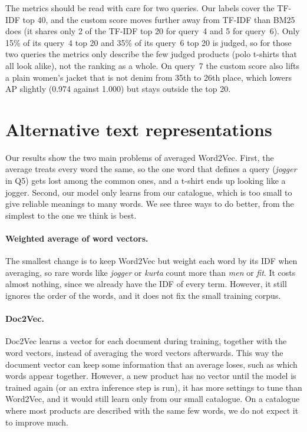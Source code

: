 \documentclass[11pt,a4paper]{article}
\begin{document}
The metrics should be read with care for two queries. Our labels cover the
TF-IDF top 40, and the custom score moves further away from TF-IDF than BM25
does (it shares only 2 of the TF-IDF top 20 for query~4 and 5 for query~6).
Only 15\% of its query~4 top 20 and 35\% of its query~6 top 20 is judged, so
for those two queries the metrics only describe the few judged products
(polo t-shirts that all look alike), not the ranking as a whole. On query~7
the custom score also lifts a plain women's jacket that is not denim from
35th to 26th place, which lowers AP slightly (0.974 against 1.000) but stays
outside the top 20.

\section{Alternative text representations}

Our results show the two main problems of averaged Word2Vec. First, the average treats every word the same, so the one word that defines a query (\emph{jogger} in Q5) gets lost among the common ones, and a t-shirt ends up looking like a jogger. Second, our model only learns from our catalogue, which is too small to give reliable meanings to many words. We see three ways to do better, from the simplest to the one we think is best.

\paragraph{Weighted average of word vectors.} The smallest change is to keep Word2Vec but weight each word by its IDF when averaging, so rare words like \emph{jogger} or \emph{kurta} count more than \emph{men} or \emph{fit}. It costs almost nothing, since we already have the IDF of every term. However, it still ignores the order of the words, and it does not fix the small training corpus.

\paragraph{Doc2Vec.} Doc2Vec learns a vector for each document during training, together with the word vectors, instead of averaging the word vectors afterwards. This way the document vector can keep some information that an average loses, such as which words appear together. However, a new product has no vector until the model is trained again (or an extra inference step is run), it has more settings to tune than Word2Vec, and it would still learn only from our small catalogue. On a catalogue where most products are described with the same few words, we do not expect it to improve much.
\end{document}
